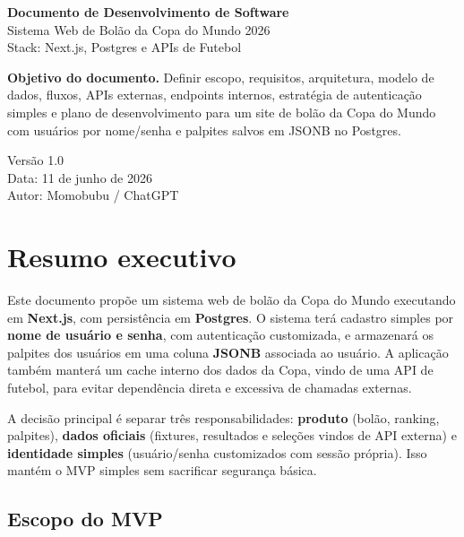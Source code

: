 \documentclass[12pt,a4paper]{article}
\begin{document}
\begin{titlepage}
\centering
\vspace*{1.2cm}
{\Huge\bfseries Documento de Desenvolvimento de Software\\[0.35cm]}
{\LARGE Sistema Web de Bolão da Copa do Mundo 2026\\[0.4cm]}
\vspace{0.8cm}
{\Large Stack: Next.js, Postgres e APIs de Futebol\\}
\vfill
\begin{tcolorbox}[colback=softblue,colframe=primary,width=0.9\textwidth,arc=2mm]
\textbf{Objetivo do documento.} Definir escopo, requisitos, arquitetura, modelo de dados, fluxos, APIs externas, endpoints internos, estratégia de autenticação simples e plano de desenvolvimento para um site de bolão da Copa do Mundo com usuários por nome/senha e palpites salvos em JSONB no Postgres.
\end{tcolorbox}
\vfill
{\large Versão 1.0\\}
{\large Data: 11 de junho de 2026\\}
{\large Autor: Momobubu / ChatGPT\\}
\end{titlepage}

\tableofcontents
\newpage

\section{Resumo executivo}

Este documento propõe um sistema web de bolão da Copa do Mundo executando em \textbf{Next.js}, com persistência em \textbf{Postgres}. O sistema terá cadastro simples por \textbf{nome de usuário e senha}, com autenticação customizada, e armazenará os palpites dos usuários em uma coluna \textbf{JSONB} associada ao usuário. A aplicação também manterá um cache interno dos dados da Copa, vindo de uma API de futebol, para evitar dependência direta e excessiva de chamadas externas.

\begin{decisionbox}
A decisão principal é separar três responsabilidades: \textbf{produto} (bolão, ranking, palpites), \textbf{dados oficiais} (fixtures, resultados e seleções vindos de API externa) e \textbf{identidade simples} (usuário/senha customizados com sessão própria). Isso mantém o MVP simples sem sacrificar segurança básica.
\end{decisionbox}

\subsection{Escopo do MVP}
\end{document}

